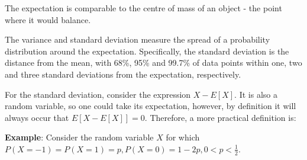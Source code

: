 The expectation is comparable to the centre of mass of an object - the point where it would balance.

The variance and standard deviation measure the spread of a probability distribution around the expectation. Specifically, the standard deviation is the distance from the mean, with 68\%, 95\% and 99.7\% of data points within one, two and three standard deviations from the expectation, respectively.

\begin{paracol}{2}


\switchcolumn

For the standard deviation, consider the expression $X - E[X]$. It is also a random variable, so one could take its expectation, however, by definition it will always occur that $E[X - E[X]] = 0$. Therefore, a more practical definition is:


\switchcolumn

\textbf{Example}: Consider the random variable $X$ for which $P(X = -1) = P(X = 1) = p, P(X = 0) = 1-2p, 0 < p < \frac{1}{2}$.


\end{paracol}

